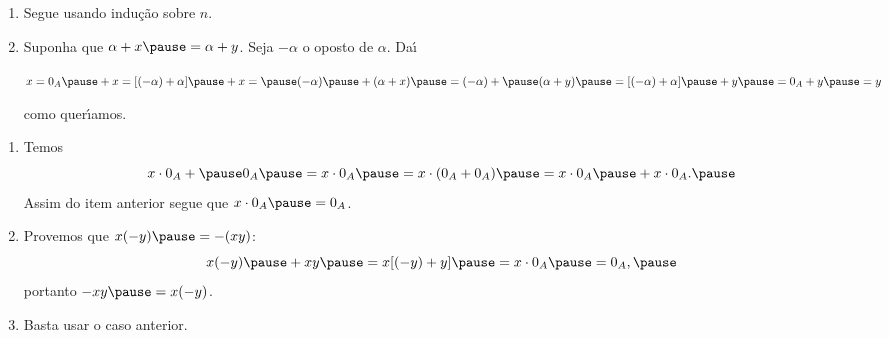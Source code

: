 \documentclass{beamer}
\begin{document}
    \begin{frame}
            \begin{enumerate}[label={\roman*})]
                \conti

                \item Segue usando indu\c{c}\~ao sobre $n$.\pause

                \vspace{.5cm}

                \item Suponha que $\alpha + x \pause = \alpha + y$. \pause Seja $-\alpha$ \pause o oposto de $\alpha$. \pause Da{\'\i}\pause
                \begin{center}
                    $x = 0_A \pause + x = [(-\alpha) + \alpha] \pause + x = \pause (-\alpha) \pause + (\alpha + x) \pause = (-\alpha) + \pause (\alpha + y) \pause = [(-\alpha) + \alpha] \pause + y \pause = 0_A + y \pause = y$\pause
                \end{center}
                como quer{\'\i}amos.\pause
                \seti
            \end{enumerate}
    \end{frame}

    \begin{frame}
            \begin{enumerate}[label={\roman*})]
                \conti
                \item Temos \pause
                \[
                    x\cdot 0_A + \pause 0_A \pause = x\cdot 0_A \pause = x\cdot(0_A + 0_A) \pause = x\cdot 0_A \pause + x\cdot 0_A.\pause
                \]
                Assim do item anterior \pause segue que $x\cdot 0_A \pause = 0_A$.\pause

                \vspace{.5cm}

                \item Provemos que \pause $x(-y) \pause = -(xy)$\pause :
                \[
                    x(-y) \pause + xy \pause = x[(-y) + y] \pause = x\cdot 0_A \pause = 0_A,\pause
                \]
                portanto $-xy \pause = x(-y)$.\pause

                \vspace{.5cm}
                
                \item Basta usar o caso anterior.\pause
            \end{enumerate}
    \end{frame}
\end{document}
